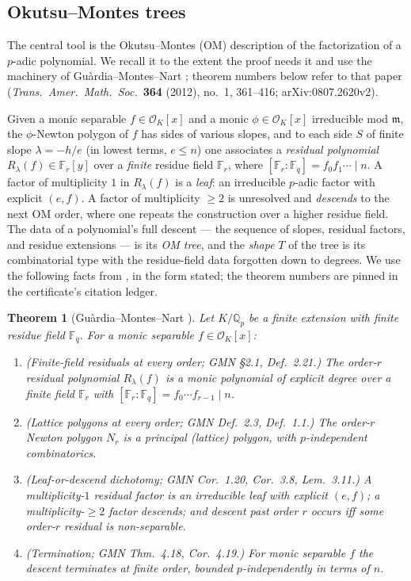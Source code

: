 \documentclass[pdflatex,sn-mathphys-num]{sn-jnl}%
\newcommand{\Qp}{\mathbb{Q}_p}
\newcommand{\OK}{\mathcal{O}_K}
\newcommand{\bbF}{\mathbb{F}}
\newcommand{\fkm}{\mathfrak{m}}
\theoremstyle{plain}
\newtheorem{theorem}{Theorem}[section]
\theoremstyle{definition}
\theoremstyle{remark}
\numberwithin{equation}{section}
\begin{document}
\subsection{Okutsu--Montes trees}\label{sec:om}

The central tool is the Okutsu--Montes (OM) description of the factorization of a
$p$-adic polynomial. We recall it to the extent the proof needs it and use the
machinery of Gu\`ardia--Montes--Nart \cite{gmn2012}; theorem numbers below refer to
that paper (\emph{Trans.\ Amer.\ Math.\ Soc.}\ \textbf{364} (2012), no.~1,
361--416; arXiv:0807.2620v2).

Given a monic separable $f\in\OK[x]$ and a monic $\phi\in\OK[x]$ irreducible mod
$\fkm$, the $\phi$-Newton polygon of $f$ has sides of various slopes, and to each
side $S$ of finite slope $\lambda=-h/e$ (in lowest terms, $e\le n$) one associates
a \emph{residual polynomial} $R_{\lambda}(f)\in\bbF_{r}[y]$ over a \emph{finite}
residue field $\bbF_{r}$, where $[\bbF_{r}:\bbF_{q}]=f_{0}f_{1}\cdots\mid n$. A
factor of multiplicity $1$ in $R_{\lambda}(f)$ is a \emph{leaf}: an irreducible
$p$-adic factor with explicit $(e,f)$. A factor of multiplicity $\ge 2$ is
unresolved and \emph{descends} to the next OM order, where one repeats the
construction over a higher residue field. The data of a polynomial's full descent
--- the sequence of slopes, residual factors, and residue extensions --- is its
\emph{OM tree}, and the \emph{shape} $T$ of the tree is its combinatorial type
with the residue-field data forgotten down to degrees. We use the following
facts from \cite{gmn2012}, in the form stated; the theorem numbers are pinned in
the certificate's citation ledger.

\begin{theorem}[Gu\`ardia--Montes--Nart \cite{gmn2012}]\label{hyp:gmn}
Let $K/\Qp$ be a finite extension with finite residue field $\bbF_q$. For a
monic separable $f\in\OK[x]$:
\begin{enumerate}[label=\textup{(GMN\arabic*)},leftmargin=3.5em]
\item \textup{(Finite-field residuals at every order; GMN \S2.1, Def.~2.21.)}
The order-$r$ residual polynomial $R_{\lambda}(f)$ is a monic polynomial of
explicit degree over a \emph{finite} field $\bbF_{r}$ with
$[\bbF_{r}:\bbF_{q}]=f_{0}\cdots f_{r-1}\mid n$.
\item \textup{(Lattice polygons at every order; GMN Def.~2.3, Def.~1.1.)}
The order-$r$ Newton polygon $N_{r}$ is a principal (lattice) polygon, with
$p$-independent combinatorics.
\item \textup{(Leaf-or-descend dichotomy; GMN Cor.~1.20, Cor.~3.8, Lem.~3.11.)}
A multiplicity-$1$ residual factor is an irreducible leaf with explicit $(e,f)$;
a multiplicity-$\ge2$ factor descends; and descent past order $r$ occurs
\emph{iff} some order-$r$ residual is non-separable.
\item \textup{(Termination; GMN Thm.~4.18, Cor.~4.19.)}
For monic separable $f$ the descent terminates at finite order, bounded
$p$-independently in terms of $n$.
\end{enumerate}
\end{theorem}
\end{document}
